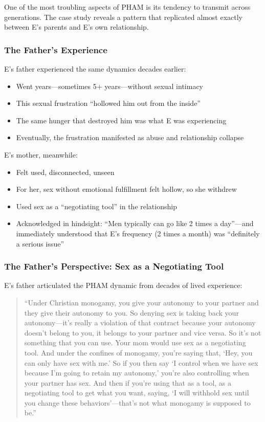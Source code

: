 \documentclass[12pt, letterpaper]{article}
\begin{document}
One of the most troubling aspects of PHAM is its tendency to transmit across generations. The case study reveals a pattern that replicated almost exactly between E's parents and E's own relationship.

\subsubsection{The Father's Experience}

E's father experienced the same dynamics decades earlier:

\begin{itemize}
    \item Went years---sometimes 5+ years---without sexual intimacy
    \item This sexual frustration ``hollowed him out from the inside''
    \item The same hunger that destroyed him was what E was experiencing
    \item Eventually, the frustration manifested as abuse and relationship collapse
\end{itemize}

E's mother, meanwhile:

\begin{itemize}
    \item Felt used, disconnected, unseen
    \item For her, sex without emotional fulfillment felt hollow, so she withdrew
    \item Used sex as a ``negotiating tool'' in the relationship
    \item Acknowledged in hindsight: ``Men typically can go like 2 times a day''---and immediately understood that E's frequency (2 times a month) was ``definitely a serious issue''
\end{itemize}

\subsubsection{The Father's Perspective: Sex as a Negotiating Tool}

E's father articulated the PHAM dynamic from decades of lived experience:

\begin{quote}
``Under Christian monogamy, you give your autonomy to your partner and they give their autonomy to you. So denying sex is taking back your autonomy---it's really a violation of that contract because your autonomy doesn't belong to you, it belongs to your partner and vice versa. So it's not something that you can use. Your mom would use sex as a negotiating tool. And under the confines of monogamy, you're saying that, `Hey, you can only have sex with me.' So if you then say `I control when we have sex because I'm going to retain my autonomy,' you're also controlling when your partner has sex. And then if you're using that as a tool, as a negotiating tool to get what you want, saying, `I will withhold sex until you change these behaviors'---that's not what monogamy is supposed to be.''
\end{quote}
\end{document}
